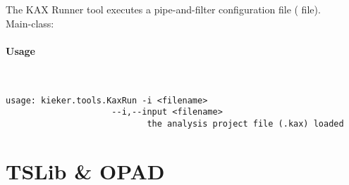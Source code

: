			The KAX Runner tool executes a \KiekerAnalysisPart{} pipe-and-filter configuration file ( file). \\

			\noindent Main-class: {\small {}}

			\paragraph*{Usage}\

				\setTextListing
				\begin{lstlisting}[gobble = 10]
					usage: kieker.tools.KaxRun -i <filename>
					 --i,--input <filename>
							the analysis project file (.kax) loaded
				\end{lstlisting}	
			
	\section{TSLib \& OPAD}
	